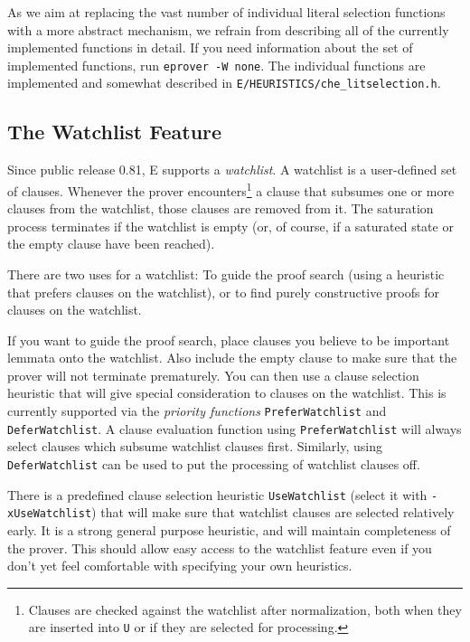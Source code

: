 \documentclass{article}
\begin{document}
As we aim at replacing the vast number of individual literal selection
functions with a more abstract mechanism, we refrain from describing
all of the currently implemented functions in detail. If you need
information about the set of implemented functions, run
\texttt{eprover -W none}. The individual functions are implemented and
somewhat described in \texttt{E/HEURISTICS/che\_litselection.h}.


\subsection{The Watchlist Feature}
\label{sec:options:watchlist}

Since public release 0.81, E supports a \emph{watchlist}. A watchlist
is a user-defined set of clauses. Whenever the prover
encounters\footnote{Clauses are checked against the watchlist after
  normalization, both when they are inserted into \texttt{U} or if
  they are selected for processing.} a clause that subsumes one or
more clauses from the watchlist, those clauses are removed from it.
The saturation process terminates if the watchlist is empty (or, of
course, if a saturated state or the empty clause have been reached).

There are two uses for a watchlist: To guide the proof search (using a
heuristic that prefers clauses on the watchlist), or to find purely
constructive proofs for clauses on the watchlist. 

If you want to guide the proof search, place clauses you believe to be
important lemmata onto the watchlist. Also include the empty clause to
make sure that the prover will not terminate prematurely.  You can
then use a clause selection heuristic that will give special
consideration to clauses on the watchlist. This is currently supported
via the \emph{priority functions} \texttt{PreferWatchlist} and
\texttt{DeferWatchlist}. A clause evaluation function using
\texttt{PreferWatchlist} will always select clauses which subsume
watchlist clauses first. Similarly, using \texttt{DeferWatchlist} can
be used to put the processing of watchlist clauses off.

There is a predefined clause selection heuristic \texttt{UseWatchlist}
(select it with \texttt{-xUseWatchlist}) that will make sure that
watchlist clauses are selected relatively early. It is a strong
general purpose heuristic, and will maintain completeness of the
prover. This should allow easy access to the watchlist feature even
if you don't yet feel comfortable with specifying your own
heuristics. 
\end{document}
